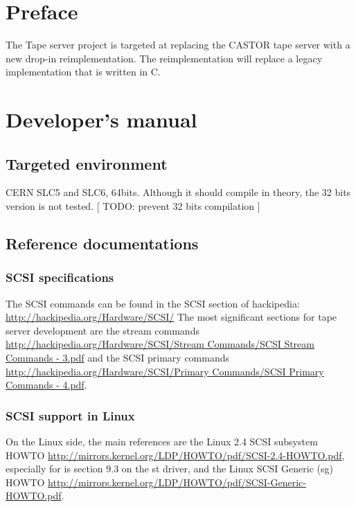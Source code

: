 \chapter*{Preface}

The Tape server project is targeted at replacing the CASTOR tape server with a new drop-{}in reimplementation. The reimplementation will replace a legacy implementation that is written in C.


\chapter{Developer's manual}

\section{Targeted environment}

CERN SLC5 and SLC6, 64bits. Although it should compile in theory, the 32 bits version is not tested. [ TODO: prevent 32 bits compilation ]

\section{Reference documentations}
\subsection{SCSI specifications}

The SCSI commands can be found in the SCSI section of hackipedia:
 \href{http://hackipedia.org/Hardware/SCSI/}{http://hackipedia.org/Hardware/SCSI/}   The most significant sections for tape server development are the stream commands
 \href{http://hackipedia.org/Hardware/SCSI/Stream%20Commands/SCSI%20Stream%20Commands%20-%203.pdf}
    {http://hackipedia.org/Hardware/SCSI/Stream Commands/SCSI Stream Commands - 3.pdf} 
 and the SCSI primary commands
    \href{http://hackipedia.org/Hardware/SCSI/Primary%20Commands/SCSI%20Primary%20Commands%20-%204.pdf}
      {http://hackipedia.org/Hardware/SCSI/Primary Commands/SCSI Primary Commands - 4.pdf}.

\subsection{SCSI support in Linux}
On the Linux side, the main references are the Linux 2.4 SCSI subsystem HOWTO
\href{http://mirrors.kernel.org/LDP/HOWTO/pdf/SCSI-2.4-HOWTO.pdf}{http://mirrors.kernel.org/LDP/HOWTO/pdf/SCSI-2.4-HOWTO.pdf},
especially for is section 9.3 on the st driver,
and the Linux SCSI Generic (sg) HOWTO 
 \href{http://mirrors.kernel.org/LDP/HOWTO/pdf/SCSI-Generic-HOWTO.pdf}{http://mirrors.kernel.org/LDP/HOWTO/pdf/SCSI-Generic-HOWTO.pdf}.

